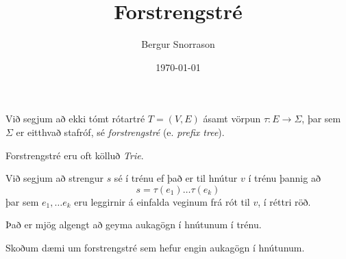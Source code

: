 \title{Forstrengstré}
\author{Bergur Snorrason}
\date{\today}



\frame{\titlepage}

{
	{
		\item<1-> Við segjum að ekki tómt rótartré $T = (V, E)$ ásamt vörpun $\tau \colon E \rightarrow \Sigma$,
					þar sem $\Sigma$ er eitthvað stafróf, sé \emph{forstrengstré} (e. \emph{prefix tree}).
		\item<2-> Forstrengstré eru oft kölluð \emph{Trie}.
		\item<3-> Við segjum að strengur $s$ sé í trénu ef það er til hnútur $v$ í trénu þannig að
						\[
							s = \tau(e_1) \dots \tau(e_k)
						\]
					þar sem $e_1, \dots e_k$ eru leggirnir á einfalda veginum frá rót til $v$, í réttri röð.
		\item<4-> Það er mjög algengt að geyma aukagögn í hnútunum í trénu.
		\item<5-> Skoðum dæmi um forstrengstré sem hefur engin aukagögn í hnútunum.
	}
}

